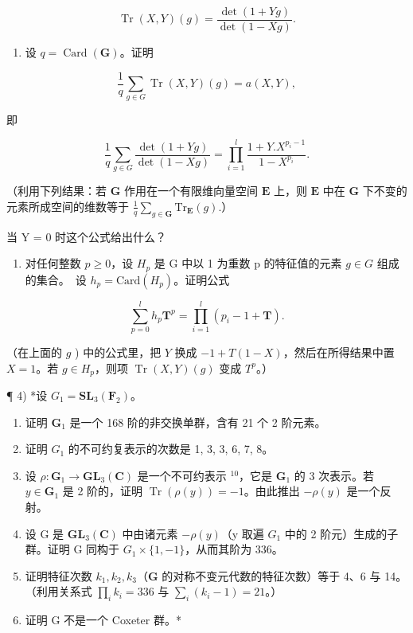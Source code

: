 \[
\operatorname{Tr} (X, Y) (g) = \frac {\det (1 + Y g)}{\det (1 - X g)}.
\]

\begin{enumerate}
\def\labelenumi{\alph{enumi})}
\setcounter{enumi}{6}
\tightlist
\item
  设 \(q = \operatorname{Card}(\mathbf{G})\)。证明
\end{enumerate}

\[
\frac {1}{q} \sum_ {g \in G} \operatorname{Tr} (X, Y) (g) = a (X, Y),
\]

即

\[
\frac {1}{q} \sum_ {g \in G} \frac {\det (1 + Y g)}{\det (1 - X g)} = \prod_ {i = 1} ^ {l} \frac {1 + Y . X ^ {p _ {i} - 1}}{1 - X ^ {p _ {i}}}.
\]

（利用下列结果：若 \(\mathbf{G}\) 作用在一个有限维向量空间 \(\mathbf{E}\) 上，则 \(\mathbf{E}\) 中在 \(\mathbf{G}\) 下不变的元素所成空间的维数等于 \(\frac{1}{q}\sum_{g\in \mathbf{G}}\mathrm{Tr}_{\mathbf{E}}(g).\)）

当 Y = 0 时这个公式给出什么？

\begin{enumerate}
\def\labelenumi{\alph{enumi})}
\setcounter{enumi}{7}
\tightlist
\item
  对任何整数 \(p \geqslant 0\)，设 \(H_{p}\) 是 G 中以 1 为重数 p 的特征值的元素 \(g \in G\) 组成的集合。~设 \(h_{p} = \text{Card}(H_{p})\)。证明公式
\end{enumerate}

\[
\sum_ {p = 0} ^ {l} h _ {p} \mathbf {T} ^ {p} = \prod_ {i = 1} ^ {l} (p _ {i} - 1 + \mathbf {T}).
\]

（在上面的 \(g\) ) 中的公式里，把 \(Y\) 换成 \(-1 + T(1 - X)\)，然后在所得结果中置 \(X = 1\)。若 \(g \in H_p\)，则项 \(\operatorname{Tr}(X, Y)(g)\) 变成 \(T^p\)。）

¶ 4) *设 \(G _ {1} = \mathbf {S L} _ {3} (\mathbf {F} _ {2})\)。

\begin{enumerate}
\def\labelenumi{\alph{enumi})}
\item
  证明 \(\mathbf{G}_1\) 是一个 168 阶的非交换单群，含有 21 个 2 阶元素。
\item
  证明 \(G_{1}\) 的不可约复表示的次数是 1, 3, 3, 6, 7, 8。
\item
  设 \(\rho: \mathbf{G}_1 \to \mathbf{GL}_3(\mathbf{C})\) 是一个不可约表示 \(^{10}\)，它是 \(\mathbf{G}_1\) 的 3 次表示。若 \(y \in \mathbf{G}_1\) 是 2 阶的，证明 \(\operatorname{Tr}(\rho(y)) = -1\)。由此推出 \(-\rho(y)\) 是一个反射。
\item
  设 G 是 \(\mathbf{GL}_{3}(\mathbf{C})\) 中由诸元素 \(-\rho(y)\)（y 取遍 \(G_{1}\) 中的 2 阶元）生成的子群。证明 G 同构于 \(G_{1} \times \{1, -1\}\)，从而其阶为 336。
\item
  证明特征次数 \(k_{1}, k_{2}, k_{3}\)（\(\mathbf{G}\) 的对称不变元代数的特征次数）等于 4、6 与 14。（利用关系式 \(\prod_{i} k_{i} = 336\) 与 \(\sum_{i} (k_{i} - 1) = 21\)。）
\item
  证明 G 不是一个 Coxeter 群。*
\end{enumerate}

